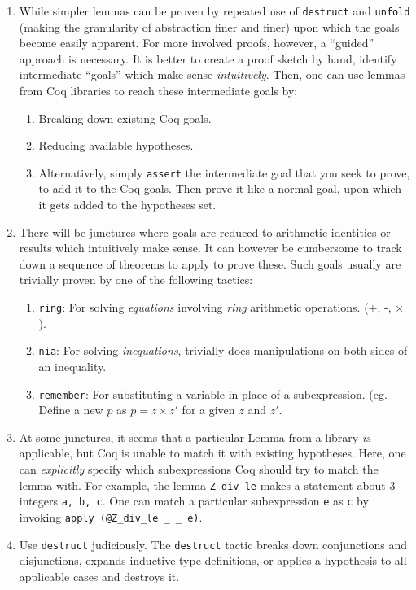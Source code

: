 \begin{enumerate}
\def\labelenumi{\arabic{enumi}.}
\item
  While simpler lemmas can be proven by repeated use of
  \texttt{destruct} and \texttt{unfold} (making the granularity of
  abstraction finer and finer) upon which the goals become easily
  apparent. For more involved proofs, however, a ``guided'' approach is
  necessary. It is better to create a proof sketch by hand, identify
  intermediate ``goals'' which make sense \emph{intuitively}. Then, one
  can use lemmas from Coq libraries to reach these intermediate goals
  by:

  \begin{enumerate}
  \def\labelenumii{\roman{enumii}.}
  \tightlist
  \item
    Breaking down existing Coq goals.
  \item
    Reducing available hypotheses.
  \item
    Alternatively, simply \texttt{assert} the intermediate goal that you
    seek to prove, to add it to the Coq goals. Then prove it like a
    normal goal, upon which it gets added to the hypotheses set.
  \end{enumerate}
\item
  There will be junctures where goals are reduced to arithmetic
  identities or results which intuitively make sense. It can however be
  cumbersome to track down a sequence of theorems to apply to prove
  these. Such goals usually are trivially proven by one of the following
  tactics:

  \begin{enumerate}
  \def\labelenumii{\roman{enumii}.}
  \tightlist
  \item
    \texttt{ring}: For solving \emph{equations} involving \emph{ring}
    arithmetic operations. (+, -, \(\times\)).
  \item
    \texttt{nia}: For solving \emph{inequations}, trivially does
    manipulations on both sides of an inequality.
  \item
    \texttt{remember}: For substituting a variable in place of a
    subexpression. (eg. Define a new \(p\) as \(p = z \times z'\) for a
    given \(z\) and \(z'\).
  \end{enumerate}
\item
  At some junctures, it seems that a particular Lemma from a library
  \emph{is} applicable, but Coq is unable to match it with existing
  hypotheses. Here, one can \emph{explicitly} specify which
  subexpressions Coq should try to match the lemma with. For example,
  the lemma \texttt{Z\_div\_le} makes a statement about 3 integers
  \texttt{a,\ b,\ c}. One can match a particular subexpression
  \texttt{e} as \texttt{c} by invoking
  \texttt{apply\ (@Z\_div\_le\ \_\ \_\ e)}.
\item
  Use \texttt{destruct} judiciously. The \texttt{destruct} tactic breaks
  down conjunctions and disjunctions, expands inductive type
  definitions, or applies a hypothesis to all applicable cases and
  destroys it.


\end{enumerate}
